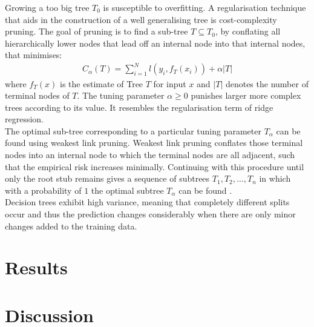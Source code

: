 \documentclass[a4paper, 11pt]{article}
\begin{document}
Growing a too big tree $T_0$ is susceptible to overfitting. A regularisation technique that aids in the construction of a well generalising tree is cost-complexity pruning. The goal of pruning is to find a sub-tree $T \subseteq T_0$, by conflating all hierarchically lower nodes that lead off an internal node into that internal nodes, that minimises:
\begin{align*}
C_\alpha(T) = \sum_{i = 1}^{N} l(y_i, f_T(x_i)) + \alpha |T|
\end{align*}
where $f_T(x)$ is the estimate of Tree $T$ for input $x$ and $|T|$ denotes the number of terminal nodes of $T$. The tuning parameter $\alpha \geq 0$ punishes larger more complex trees according to its value. It resembles the regularisation term of ridge regression. \\
The optimal sub-tree corresponding to a particular tuning parameter $T_{\alpha}$ can be found using weakest link pruning. Weakest link pruning conflates those terminal nodes into an internal node to which the terminal nodes are all adjacent, such that the empirical risk increases minimally. Continuing with this procedure until only the root stub remains gives a sequence of subtrees $T_1, T_2, \ldots, T_n$ in which with a probability of $1$ the optimal subtree $T_{\alpha}$ can be found \cite{breiman1984classification}.\\

Decision trees exhibit high variance, meaning that completely different splits occur and thus the prediction changes considerably when there are only minor changes added to the training data. 

\section{Results}

\section{Discussion}

\printbibliography
\end{document}
